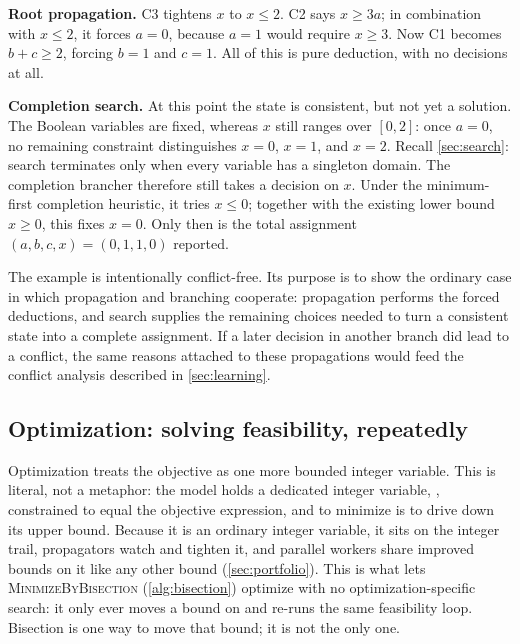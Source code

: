 \textbf{Root propagation.} C3 tightens $x$ to $x \le 2$. C2 says
$x \ge 3a$; in combination with $x \le 2$, it forces $a = 0$, because $a = 1$
would require $x \ge 3$. Now C1 becomes $b + c \ge 2$, forcing $b = 1$ and
$c = 1$. All of this is pure deduction, with no decisions at all.

\textbf{Completion search.} At this point the state is consistent, but not yet a
solution. The Boolean variables are fixed, whereas $x$ still ranges over
$[0,2]$: once $a=0$, no remaining constraint distinguishes $x=0$, $x=1$, and
$x=2$. Recall \cref{sec:search}: search terminates only when every
variable has a singleton domain. The completion brancher therefore still takes a
decision on $x$. Under the minimum-first completion heuristic, it tries
$x \le 0$; together with the existing lower bound $x \ge 0$, this fixes $x=0$.
Only then is the total assignment $(a,b,c,x) = (0,1,1,0)$ reported.

The example is intentionally conflict-free. Its purpose is to show the ordinary
case in which propagation and branching cooperate: propagation performs the
forced deductions, and search supplies the remaining choices needed to turn a
consistent state into a complete assignment. If a later decision in another
branch did lead to a conflict, the same reasons attached to these propagations
would feed the conflict analysis described in \cref{sec:learning}.

\subsection{Optimization: solving feasibility, repeatedly}\label{sec:opt}

Optimization treats the objective as one more bounded integer variable. This is
literal, not a metaphor: the model holds a dedicated integer variable,
, constrained to equal the
objective expression, and to
minimize is to drive down its upper bound. Because it is an ordinary integer
variable, it sits on the integer trail, propagators watch and tighten it, and
parallel workers share improved bounds on it like any other bound
(\cref{sec:portfolio}). This is what lets \textsc{MinimizeByBisection}
(\cref{alg:bisection}) optimize with no optimization-specific search: it
only ever moves a bound on  and re-runs the same feasibility
loop. Bisection is one way to move that bound; it is not the only one.

